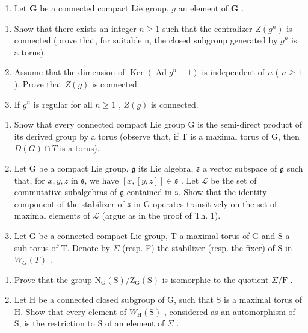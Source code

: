 
\begin{enumerate}
\def\labelenumi{\arabic{enumi})}
\tightlist
\item
  Let \(\mathbf{G}\) be a connected compact Lie group, \(g\) an element of \(\mathbf{G}\) .
\end{enumerate}

\begin{enumerate}
\def\labelenumi{\alph{enumi})}
\item
  Show that there exists an integer \(n \geq 1\) such that the centralizer \(Z(g^{n})\) is connected (prove that, for suitable n, the closed subgroup generated by \(g^{n}\) is a torus).
\item
  Assume that the dimension of \(\operatorname{Ker}(\operatorname{Ad}g^n - 1)\) is independent of \(n\) ( \(n \geq 1\) ). Prove that \(Z(g)\) is connected.
\item
  If \(g^n\) is regular for all \(n \geq 1\) , \(Z(g)\) is connected.
\end{enumerate}

\begin{enumerate}
\def\labelenumi{\arabic{enumi})}
\setcounter{enumi}{1}
\item
  Show that every connected compact Lie group G is the semi-direct product of its derived group by a torus (observe that, if T is a maximal torus of G, then \(D(G) \cap T\) is a torus).
\item
  Let G be a compact Lie group, \(\mathfrak{g}\) its Lie algebra, \(\mathfrak{s}\) a vector subspace of \(\mathfrak{g}\) such that, for \(x, y, z\) in \(\mathfrak{s}\), we have \([x, [y, z]] \in \mathfrak{s}\) . Let \(\mathcal{L}\) be the set of commutative subalgebras of \(\mathfrak{g}\) contained in \(\mathfrak{s}\). Show that the identity component of the stabilizer of \(\mathfrak{s}\) in G operates transitively on the set of maximal elements of \(\mathcal{L}\) (argue as in the proof of Th. 1).
\item
  Let G be a connected compact Lie group, T a maximal torus of G and S a sub-torus of T. Denote by \(\Sigma\) (resp. F) the stabilizer (resp. the fixer) of S in \(W_{G}(T)\) .
\end{enumerate}

\begin{enumerate}
\def\labelenumi{\alph{enumi})}
\item
  Prove that the group \(\mathrm{N_G(S) / Z_G(S)}\) is isomorphic to the quotient \(\Sigma /\mathrm{F}\) .
\item
  Let H be a connected closed subgroup of G, such that S is a maximal torus of H. Show that every element of \(W_{\mathrm{H}}(\mathrm{S})\) , considered as an automorphism of S, is the restriction to S of an element of \(\Sigma\) .
\end{enumerate}

